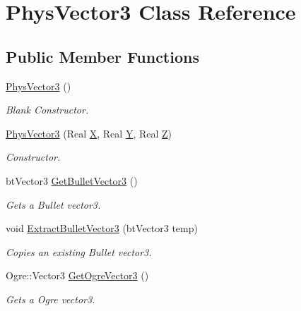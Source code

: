 \hypertarget{classPhysVector3}{
\section{PhysVector3 Class Reference}
\label{da/d11/classPhysVector3}
}
\subsection*{Public Member Functions}
\begin{DoxyCompactItemize}
\item 
\hyperlink{classPhysVector3_a0d68895a6479ed7f875f666ce381afba}{PhysVector3} ()
\begin{DoxyCompactList}\small\item\em Blank Constructor. \item\end{DoxyCompactList}\item 
\hyperlink{classPhysVector3_a0fd6687cacb095a14a398fd88a33d76a}{PhysVector3} (Real \hyperlink{classPhysVector3_a8fb29119f25c996da9d091fd6ce5693f}{X}, Real \hyperlink{classPhysVector3_a45b7fdd4361f9e31b36eab4551c1e558}{Y}, Real \hyperlink{classPhysVector3_a728c752b813e3191231904f629050a74}{Z})
\begin{DoxyCompactList}\small\item\em Constructor. \item\end{DoxyCompactList}\item 
btVector3 \hyperlink{classPhysVector3_adfc5f9e933a94be994ce5ce0c38d1f96}{GetBulletVector3} ()
\begin{DoxyCompactList}\small\item\em Gets a Bullet vector3. \item\end{DoxyCompactList}\item 
void \hyperlink{classPhysVector3_a71a78da9e8011cb727010f8ba3acf546}{ExtractBulletVector3} (btVector3 temp)
\begin{DoxyCompactList}\small\item\em Copies an existing Bullet vector3. \item\end{DoxyCompactList}\item 
Ogre::Vector3 \hyperlink{classPhysVector3_a01facc2b865bb79c589ed1985dd6c49c}{GetOgreVector3} ()
\begin{DoxyCompactList}\small\item\em Gets a Ogre vector3. \item\end{DoxyCompactList}\item 

\end{DoxyCompactItemize}
